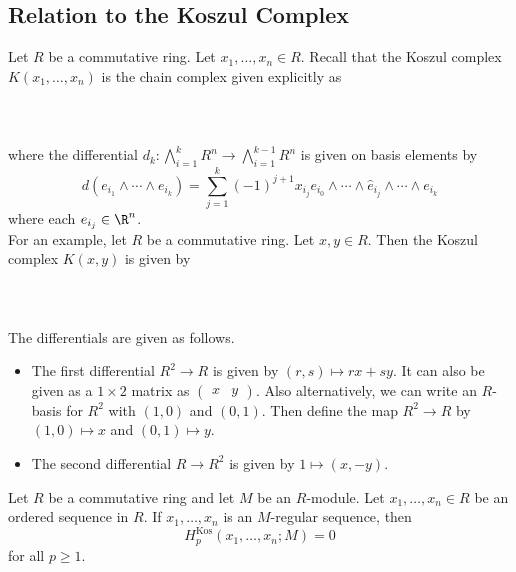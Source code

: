\documentclass[a4paper]{article}
\begin{document}
\subsection{Relation to the Koszul Complex}
Let $R$ be a commutative ring. Let $x_1,\dots,x_n\in R$. Recall that the Koszul complex $K(x_1,\dots,x_n)$ is the chain complex given explicitly as \\~\\
\\~\\
where the differential $d_k:\bigwedge_{i=1}^kR^n\to\bigwedge_{i=1}^{k-1}R^n$ is given on basis elements by $$d(e_{i_1}\wedge\cdots\wedge e_{i_k})=\sum_{j=1}^k(-1)^{j+1}x_{i_j}e_{i_0}\wedge\cdots\wedge\hat{e}_{i_j}\wedge\cdots\wedge e_{i_k}$$ where each $e_{i_j}\in\R^n$. \\

For an example, let $R$ be a commutative ring. Let $x,y\in R$. Then the Koszul complex $K(x,y)$ is given by \\~\\
\\~\\
The differentials are given as follows. 
\begin{itemize}
\item The first differential $R^2\to R$ is given by $(r,s)\mapsto rx+sy$. It can also be given as a $1\times 2$ matrix as $\begin{pmatrix}x & y\end{pmatrix}$. Also alternatively, we can write an $R$-basis for $R^2$ with $(1,0)$ and $(0,1)$. Then define the map $R^2\to R$ by $(1,0)\mapsto x$ and $(0,1)\mapsto y$. 
\item The second differential $R\to R^2$ is given by $1\mapsto(x,-y)$. 
\end{itemize}

\begin{prp}{}{} Let $R$ be a commutative ring and let $M$ be an $R$-module. Let $x_1,\dots,x_n\in R$ be an ordered sequence in $R$. If $x_1,\dots,x_n$ is an $M$-regular sequence, then $$H_p^\text{Kos}(x_1,\dots,x_n;M)=0$$ for all $p\geq 1$. 
\end{prp}
\end{document}

